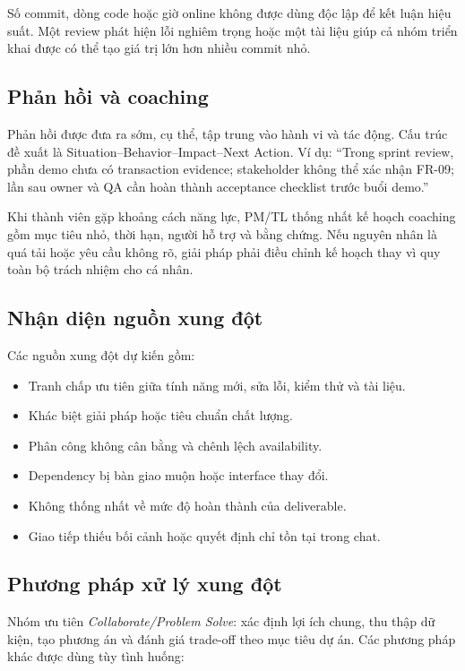 Số commit, dòng code hoặc giờ online không được dùng độc lập để kết luận hiệu suất. Một review phát hiện lỗi nghiêm trọng hoặc một tài liệu giúp cả nhóm triển khai được có thể tạo giá trị lớn hơn nhiều commit nhỏ.

\subsection{Phản hồi và coaching}

Phản hồi được đưa ra sớm, cụ thể, tập trung vào hành vi và tác động. Cấu trúc đề xuất là Situation--Behavior--Impact--Next Action. Ví dụ: ``Trong sprint review, phần demo chưa có transaction evidence; stakeholder không thể xác nhận FR-09; lần sau owner và QA cần hoàn thành acceptance checklist trước buổi demo.''

Khi thành viên gặp khoảng cách năng lực, PM/TL thống nhất kế hoạch coaching gồm mục tiêu nhỏ, thời hạn, người hỗ trợ và bằng chứng. Nếu nguyên nhân là quá tải hoặc yêu cầu không rõ, giải pháp phải điều chỉnh kế hoạch thay vì quy toàn bộ trách nhiệm cho cá nhân.

\subsection{Nhận diện nguồn xung đột}

Các nguồn xung đột dự kiến gồm:

\begin{itemize}
  \item Tranh chấp ưu tiên giữa tính năng mới, sửa lỗi, kiểm thử và tài liệu.
  \item Khác biệt giải pháp hoặc tiêu chuẩn chất lượng.
  \item Phân công không cân bằng và chênh lệch availability.
  \item Dependency bị bàn giao muộn hoặc interface thay đổi.
  \item Không thống nhất về mức độ hoàn thành của deliverable.
  \item Giao tiếp thiếu bối cảnh hoặc quyết định chỉ tồn tại trong chat.
\end{itemize}

\subsection{Phương pháp xử lý xung đột}

Nhóm ưu tiên \textit{Collaborate/Problem Solve}: xác định lợi ích chung, thu thập dữ kiện, tạo phương án và đánh giá trade-off theo mục tiêu dự án. Các phương pháp khác được dùng tùy tình huống:

